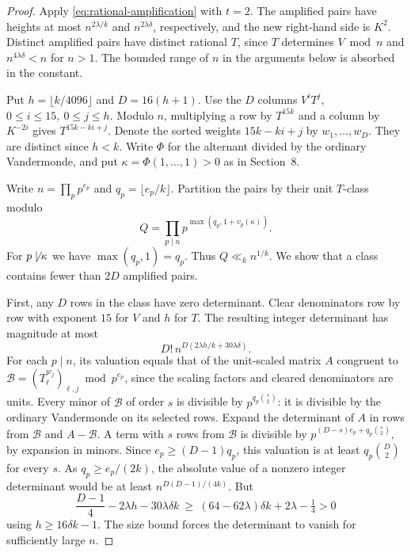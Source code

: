 \documentclass[11pt,reqno]{amsart}
\begin{document}
\begin{proof}
Apply \eqref{eq:rational-amplification} with \(t=2\).
The amplified pairs have heights at most \(n^{2\lambda/k}\)
and \(n^{2\lambda\delta}\), respectively, and the new
right-hand side is \(K^2\). Distinct amplified pairs have
distinct rational \(T\), since \(T\) determines \(V\bmod n\)
and \(n^{4\lambda\delta}<n\) for \(n>1\).
The bounded range of \(n\) in the arguments below is absorbed
in the constant.

Put \(h=\lfloor k/4096\rfloor\) and \(D=16(h+1)\).
Use the \(D\) columns \(V^iT^j\), \(0\le i\le15,\ 0\le j\le h\).
Modulo \(n\), multiplying a row by \(T^{15k}\) and a column
by \(K^{-2i}\) gives \(T^{15k-ki+j}\). Denote the sorted
weights \(15k-ki+j\) by \(w_1,\ldots,w_D\). They are distinct
since \(h<k\). Write \(\Phi\) for the alternant divided
by the ordinary Vandermonde, and put \(\kappa=\Phi(1,\ldots,1)>0\)
as in Section~8.

Write \(n=\prod_{p}p^{e_p}\) and \(q_p=\lfloor e_p/k\rfloor\).
Partition the pairs by their unit \(T\)-class modulo
\[
 Q=\prod_{p\mid n}p^{\max(q_p,1+v_p(\kappa))}.
\]
For \(p\not\mid\kappa\) we have \(\max(q_p,1)=q_p\).
Thus \(Q\ll_k n^{1/k}\).
We show that a class contains fewer than \(2D\) amplified
pairs.

First, any \(D\) rows in the class have zero determinant.
Clear denominators row by row with exponent \(15\) for
\(V\) and \(h\) for \(T\). The resulting integer determinant
has magnitude at most
\[
 D!\, n^{D(2\lambda h/k+30\lambda\delta)}.
\]
For each \(p\mid n\), its valuation equals that of the
unit-scaled matrix \(A\) congruent to
\(\mathcal B=(T_\ell^{w_j})_{\ell,j}\bmod p^{e_p}\),
since the scaling factors and cleared denominators are units.
Every minor of \(\mathcal B\) of order \(s\) is
divisible by \(p^{q_p\binom s2}\): it is divisible by the
ordinary Vandermonde on its selected rows.
Expand the determinant of \(A\) in rows from
\(\mathcal B\) and \(A-\mathcal B\). A term with \(s\) rows
from \(\mathcal B\) is divisible by
\(p^{(D-s)e_p+q_p\binom s2}\), by expansion in minors.
Since \(e_p\ge (D-1)q_p\), this valuation is at least
\(q_p\binom D2\) for every \(s\).
As \(q_p\ge e_p/(2k)\), the absolute value of a nonzero
integer determinant would be at least
\(n^{D(D-1)/(4k)}\).
But
\[
 \frac{D-1}{4}-2\lambda h-30\lambda\delta k
 \ \ge\ (64-62\lambda)\delta k+2\lambda-\tfrac14>0
\]
using \(h\ge16\delta k-1\). The size bound forces the
determinant to vanish for sufficiently large \(n\).


\end{proof}
\end{document}
